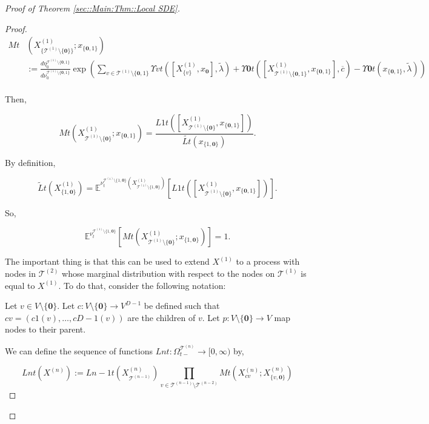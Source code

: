 \documentclass[12pt]{article}
\newcommand{\mb}{\mathbb}
\newcommand{\mc}{\mathcal}
\newcommand{\ra}{\rightarrow}
\newcommand{\ov}{\overline}
\newcommand{\ind}{\hspace{24pt}}
\newcommand{\exmu}[2]{\mb{E}^{#1}\left[#2\right]}	%
\newcommand{\defeq}{:=}								%
\renewcommand{\root}{\mathbf{0}}				%
\renewcommand{\v}{v}							%
\newcommand{\x}{x}								%
\renewcommand{\t}{t}							%
\newcommand{\sset}{\Omega}						%
\newcommand{\X}{X}								%
\newcommand{\vind}[1]{^{#1}}					%
\newcommand{\vsi}[1]{^{#1}}						%
\newcommand{\cind}[1]{_{#1}}					%
\newcommand{\tip}[1]{#1}						%
\newcommand{\ts}[1]{_{#1}}						%
\newcommand{\degr}{D}							%
\newcommand{\IGrg}{\ov{c}}						%
\newcommand{\tree}{\mc{T}}						%
\newcommand{\sln}[1]{^{(#1)}}					%
\newcommand{\alt}[1]{\widetilde{#1}}			%
\newcommand{\mm}{\nu}							%
\newcommand{\mmm}{\eta}							%
\newcommand{\crate}{\alt{\lambda}}				%
\newcommand{\dense}{L}							%
\newcommand{\cdense}{M}							%
\newcommand{\ds}{\Upsilon}						%
\renewcommand{\c}{c}							%
\newcommand{\p}{p}								%
\begin{document}
\begin{proof}[Proof of Theorem \ref{sec::Main:Thm::Local SDE}]
\begin{proof}
\begin{align*}
\cdense{}{\t}&(\X\sln{1}\cind{\{\tree\sln{1}\setminus\{\root\}\}}\tip{};\x\cind{\{\root,1\}}\tip{})\\
& \defeq\frac{d\mmm\vind{\tree\sln{1}\setminus\{\root,1\}}\ts{0}}{d\mm\vind{\tree\sln{1}\setminus\{\root,1\}}\ts{0}}\exp\left(\sum_{\v\in \tree\sln{1}\setminus\{\root,1\}} \ds{\v}{\t}([\X\sln{1}\cind{\{v\}}\tip{},\x\cind{\root}\tip{}],\crate{}{}) + \ds{\root}{\t}([\X\sln{1}\cind{\tree\sln{1}\setminus\{\root,1\}}\tip{},\x\cind{\{\root,1\}}\tip{}],\IGrg{}) - \ds{\root}{\t}(\x\cind{\{\root,1\}}\tip{},\crate{}{})\right)\\
\end{align*}

Then,

\[\cdense{}{\t}(\X\sln{1}\cind{\tree\sln{1}\setminus\{\root\}}\tip{};\x\cind{\{\root,1\}}\tip{}) = \frac{\dense{1}{\t}([\X\sln{1}\cind{\tree\sln{1}\setminus\{\root\}}\tip{},\x\cind{\{\root,1\}}\tip{}])}{\alt{\dense{}{\t}}(\x\cind{\{1,\root\}}\tip{})}.\]

By definition,

\[\alt{\dense}{}{\t}(\X\sln{1}\cind{\{1,\root\}}\tip{}) = \exmu{\mm\vind{\tree\sln{1}\setminus\{1,\root\}}\ts{\t}(\X\sln{1}\cind{\tree\sln{1}\setminus\{1,\root\}}\tip{})}{\dense{1}{\t}([\X\sln{1}\cind{\tree\sln{1}\setminus\{\root\}}\tip{},\x\cind{\{\root,1\}}\tip{}])}.\]

So,

\[\exmu{\mm\vind{\tree\sln{1}\setminus\{1,\root\}}\ts{\t}}{\cdense{}{\t}(\X\sln{1}\cind{\tree\sln{1}\setminus\{\root\}}\tip{};\x\cind{\{1,\root\}}\tip{})} = 1.\]

The important thing is that this can be used to extend \(\X\sln{1}\cind{}\tip{}\) to a process with nodes in \(\tree\sln{2}\) whose marginal distribution with respect to the nodes on \(\tree\sln{1}\) is equal to \(\X\sln{1}\cind{}\tip{}\). To do that, consider the following notation:

\ind Let \(\v \in V\setminus\{\root\}\). Let \(\c{}:V\setminus\{\root\} \ra V^{\degr-1}\) be defined such that \(\c{\v} = (\c{1}(\v),\dots,\c{\degr-1}(\v))\) are the children of \(\v\). Let \(\p{}:V\setminus\{\root\}\ra V\) map nodes to their parent.

\ind We can define the sequence of functions \(\dense{n}{\t}: \sset\vsi{\tree\sln{n}}\ts{\t-} \ra [0,\infty)\) by,

\[\dense{n}{\t}(\X\sln{n}\cind{}\tip{}) := \dense{n-1}{\t}(\X\sln{n}\cind{\tree\sln{n-1}}\tip{})\prod_{\v\in \tree\sln{n-1}\setminus\tree\sln{n-2}} \cdense{}{\t}(\X\sln{n}\cind{\c{\v}}\tip{};\X\sln{n}\cind{\{\v,\root\}}\tip{})\]


\end{proof}
\end{proof}
\end{document}
